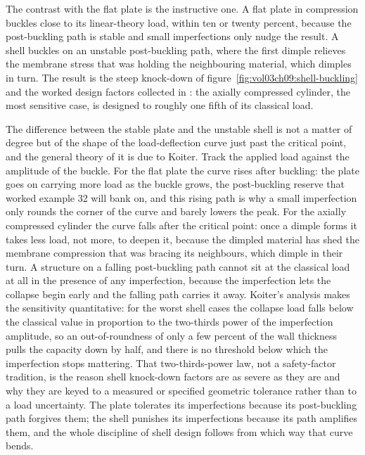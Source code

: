 

The contrast with the flat plate is the instructive one.
A flat plate in compression buckles close to its linear-theory load,
within ten or twenty percent, because the post-buckling path is stable
and small imperfections only nudge the result. A shell buckles on an
unstable post-buckling path, where the first dimple relieves the
membrane stress that was holding the neighbouring material, which
dimples in turn. The result is the steep knock-down of
figure~\ref{fig:vol03ch09:shell-buckling} and the worked design
factors collected in : the axially
compressed cylinder, the most sensitive case, is designed to roughly
one fifth of its classical load.

The difference between the stable plate and the unstable shell is not a matter
of degree but of the shape of the load-deflection curve just past the critical
point, and the general theory of it is due to Koiter. Track the applied load
against the amplitude of the buckle. For the flat plate the curve rises after
buckling: the plate goes on carrying more load as the buckle grows, the
post-buckling reserve that worked example 32 will bank on, and this rising
path is why a small imperfection only rounds the corner of the curve and
barely lowers the peak. For the axially compressed cylinder the curve falls
after the critical point: once a dimple forms it takes less load, not more, to
deepen it, because the dimpled material has shed the membrane compression that
was bracing its neighbours, which dimple in their turn. A structure on a
falling post-buckling path cannot sit at the classical load at all in the
presence of any imperfection, because the imperfection lets the collapse begin
early and the falling path carries it away. Koiter's analysis makes the
sensitivity quantitative: for the worst shell cases the collapse load falls
below the classical value in proportion to the two-thirds power of the
imperfection amplitude, so an out-of-roundness of only a few percent of the
wall thickness pulls the capacity down by half, and there is no threshold
below which the imperfection stops mattering. That two-thirds-power law, not a
safety-factor tradition, is the reason shell knock-down factors are as severe
as they are and why they are keyed to a measured or specified geometric
tolerance rather than to a load uncertainty. The plate tolerates its
imperfections because its post-buckling path forgives them; the shell punishes
its imperfections because its path amplifies them, and the whole discipline of
shell design follows from which way that curve bends.

